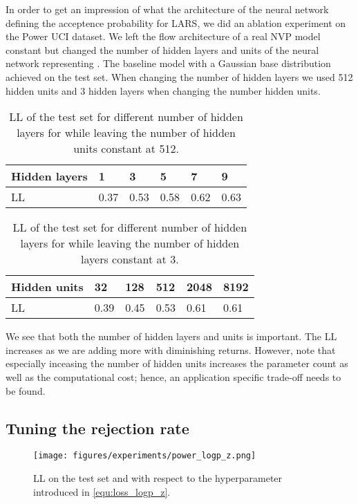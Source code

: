\documentclass[twoside]{article}
\begin{document}
In order to get an impression of what the architecture of the neural network defining the acceptence probability  for LARS, we did an ablation experiment on the Power UCI dataset. We left the flow architecture of a real NVP model constant but changed the number of hidden layers and units of the neural network representing . The baseline model with a Gaussian base distribution achieved  on the test set. When changing the number of hidden layers we used 512 hidden units and 3 hidden layers when changing the number hidden units.

\begin{table}[h]
    \centering
    \caption{LL of the test set for different number of hidden layers for  while leaving the number of hidden units constant at 512.}
    \label{tab:abl_hl}
    \begin{tabular}{l|lllll}
         Hidden layers & 1 & 3 & 5 & 7 & 9 \\
         \hline
         LL & 0.37 & 0.53 & 0.58 & 0.62 & 0.63 
    \end{tabular}
\end{table}

\begin{table}[h]
    \centering
    \caption{LL of the test set for different number of hidden layers for  while leaving the number of hidden layers constant at 3.}
    \label{tab:abl_hl}
    \begin{tabular}{l|lllll}
         Hidden units & 32 & 128 & 512 & 2048 & 8192 \\
         \hline
         LL & 0.39 & 0.45 & 0.53 & 0.61 & 0.61
    \end{tabular}
\end{table}

We see that both the number of hidden layers and units is important. The LL increases as we are adding more with diminishing returns. However, note that especially inceasing the number of hidden units increases the parameter count as well as the computational cost; hence, an application specific trade-off needs to be found.


\subsection{Tuning the rejection rate}
\label{sec:a_rejection_rate}

\begin{figure}[h]
    \centering
    \texttt{[image: figures/experiments/power\_logp\_z.png]}
    \caption{LL on the test set and  with respect to the hyperparameter  introduced in \eqref{equ:loss_logp_z}.}
    \label{fig:power_logp_z}
\end{figure}
\end{document}
